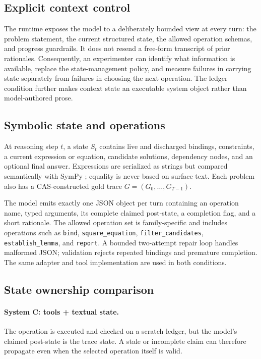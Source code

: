 \documentclass[11pt]{article}
\begin{document}
\subsection{Explicit context control}

The runtime exposes the model to a deliberately bounded view at every turn: the
problem statement, the current structured state, the allowed operation schemas, and
progress guardrails.  It does not resend a free-form transcript of prior rationales.
Consequently, an experimenter can identify what information is available, replace
the state-management policy, and measure failures in carrying state separately from
failures in choosing the next operation.  The ledger condition further makes
context state an executable system object rather than model-authored prose.

\subsection{Symbolic state and operations}

At reasoning step $t$, a state $S_t$ contains live and discharged bindings,
constraints, a current expression or equation, candidate solutions, dependency
nodes, and an optional final answer.  Expressions are serialized as strings but
compared semantically with SymPy \citep{meurer2017sympy}; equality is never based on
surface text.  Each problem also has a CAS-constructed gold trace
$G=(G_0,\ldots,G_{T-1})$.

The model emits exactly one JSON object per turn containing an operation name,
typed arguments, its complete claimed post-state, a completion flag, and a short
rationale.  The allowed operation set is family-specific and includes operations
such as \texttt{bind}, \texttt{square\_equation}, \texttt{filter\_candidates},
\texttt{establish\_lemma}, and \texttt{report}.  A bounded two-attempt repair loop
handles malformed JSON; validation rejects repeated bindings and premature
completion.  The same adapter and tool implementation are used in both conditions.

\subsection{State ownership comparison}

\paragraph{System C: tools + textual state.}
The operation is executed and checked on a scratch ledger, but the model's claimed
post-state is the trace state.  A stale or incomplete claim can therefore propagate
even when the selected operation itself is valid.
\end{document}
